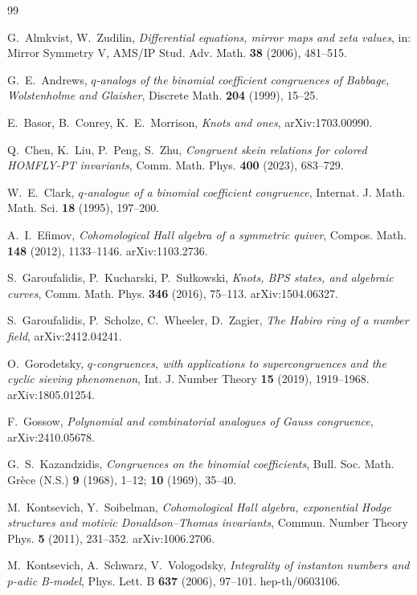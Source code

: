 \documentclass[11pt]{amsart}
\theoremstyle{definition}
\begin{document}
\begin{thebibliography}{99}

 G.~Almkvist, W.~Zudilin, \emph{Differential equations, mirror maps and zeta values}, in: Mirror Symmetry V, AMS/IP Stud. Adv. Math. \textbf{38} (2006), 481--515.

 G.~E.~Andrews, \emph{$q$-analogs of the binomial coefficient congruences of Babbage, Wolstenholme and Glaisher}, Discrete Math. \textbf{204} (1999), 15--25.

 E.~Basor, B.~Conrey, K.~E.~Morrison, \emph{Knots and ones}, arXiv:1703.00990.

 Q.~Chen, K.~Liu, P.~Peng, S.~Zhu, \emph{Congruent skein relations for colored HOMFLY-PT invariants}, Comm. Math. Phys. \textbf{400} (2023), 683--729.

 W.~E.~Clark, \emph{$q$-analogue of a binomial coefficient congruence}, Internat. J. Math. Math. Sci. \textbf{18} (1995), 197--200.

 A.~I.~Efimov, \emph{Cohomological Hall algebra of a symmetric quiver}, Compos. Math. \textbf{148} (2012), 1133--1146. arXiv:1103.2736.

 S.~Garoufalidis, P.~Kucharski, P.~Su\l kowski, \emph{Knots, BPS states, and algebraic curves}, Comm. Math. Phys. \textbf{346} (2016), 75--113. arXiv:1504.06327.

 S.~Garoufalidis, P.~Scholze, C.~Wheeler, D.~Zagier, \emph{The Habiro ring of a number field}, arXiv:2412.04241.

 O.~Gorodetsky, \emph{$q$-congruences, with applications to supercongruences and the cyclic sieving phenomenon}, Int. J. Number Theory \textbf{15} (2019), 1919--1968. arXiv:1805.01254.

 F.~Gossow, \emph{Polynomial and combinatorial analogues of Gauss congruence}, arXiv:2410.05678.

 G.~S.~Kazandzidis, \emph{Congruences on the binomial coefficients}, Bull. Soc. Math. Gr\`ece (N.S.) \textbf{9} (1968), 1--12; \textbf{10} (1969), 35--40.

 M.~Kontsevich, Y.~Soibelman, \emph{Cohomological Hall algebra, exponential Hodge structures and motivic Donaldson--Thomas invariants}, Commun. Number Theory Phys. \textbf{5} (2011), 231--352. arXiv:1006.2706.

 M.~Kontsevich, A.~Schwarz, V.~Vologodsky, \emph{Integrality of instanton numbers and $p$-adic B-model}, Phys. Lett. B \textbf{637} (2006), 97--101. hep-th/0603106.


\end{thebibliography}
\end{document}
